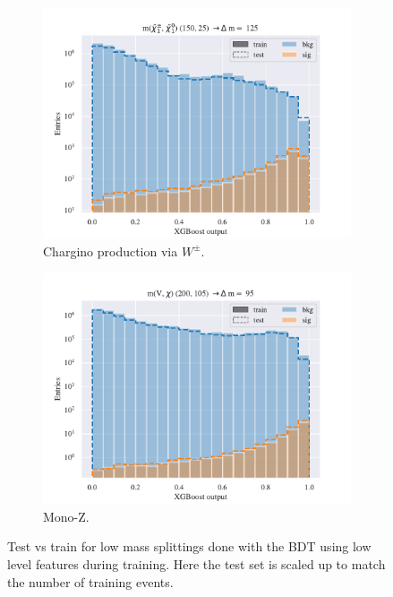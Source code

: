 \begin{figure}[H]
\begin{subfigure}[t!]{0.49\textwidth}
        \includegraphics[width = \textwidth]{Figures/WW/BDT/Low_level/Low/scaled_train_test_395268.pdf}
        \caption{Chargino production via $W^\pm$.}
        \label{fig:}
    \end{subfigure}
    \begin{subfigure}[t!]{0.49\textwidth}
        \includegraphics[width = \textwidth]{Figures/Mono_Z/ML/BDT/Low_level/Low/scaled_train_test_310604.pdf}
        \caption{Mono-Z.}
        \label{fig:}
    \end{subfigure}
    \caption{Test vs train for low mass splittings done with the BDT using low level features during training. Here the test set is scaled up to match the number of training events.}
    \label{fig:Non}
\end{figure}



